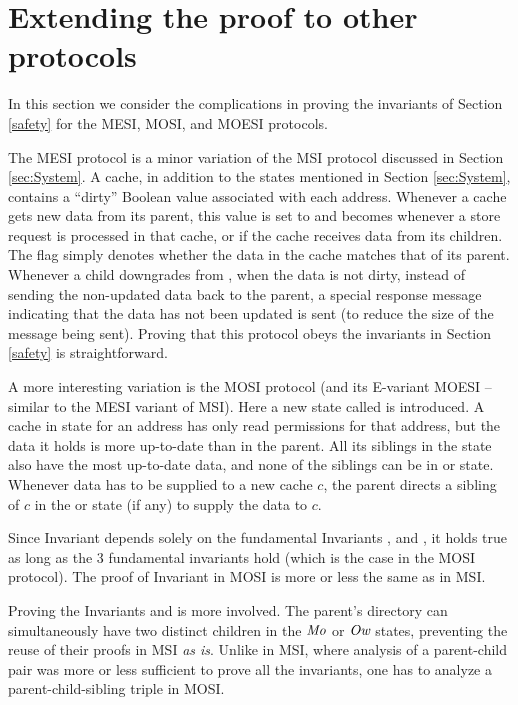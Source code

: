 \section{Extending the proof to other protocols}
\label{sec:Refinements}

In this section we consider the complications in proving the invariants
of Section \ref{safety} for the MESI, MOSI, and MOESI protocols.

The MESI protocol is a minor variation of the MSI protocol discussed in Section \ref{sec:System}.
A cache, in addition to the states mentioned in Section
\ref{sec:System}, contains a ``dirty'' Boolean value associated with each
address.  Whenever a cache gets new data from its parent, this value is set to
\False{} and becomes \True{} whenever a store request is processed in that
cache, or if the cache receives data from its children. The flag simply denotes
whether the data in the cache matches that of its parent.  Whenever a
child downgrades from \Mo{}, when the data is not dirty, instead of sending the
non-updated data back to the parent, a special response message indicating that
the data has not been updated is sent (to reduce the size of the message being
sent). Proving that this protocol obeys the invariants in Section \ref{safety}
is straightforward.

A more interesting variation is the MOSI protocol (and its E-variant MOESI --
similar to the MESI variant of MSI). Here a new state called \Ow{} is
introduced. A cache in \Ow{} state for an address has only read permissions for
that address, but the data it holds is more up-to-date than in the parent.  All
its siblings in the \Sh{} state also have the most up-to-date data, and none of
the siblings can be in \Mo{} or \Ow{} state.  Whenever data has to be supplied
to a new cache $c$, the parent directs a sibling of $c$ in the \Ow{} or \Mo{}
state (if any) to supply the data to $c$.

Since Invariant  depends solely on the fundamental Invariants
,  and , it holds true
as long as the 3 fundamental invariants hold (which is the case in the MOSI
protocol). The proof of Invariant  in MOSI is more
or less the same as in MSI.

Proving the Invariants  and
 is more involved. The parent's directory can
simultaneously have two distinct children in the $\textit{Mo}$ or $\textit{Ow}$ states,
preventing the reuse of their proofs in MSI \emph{as is}. Unlike in MSI, where
analysis of a parent-child pair was more or less sufficient to prove all the
invariants, one has to analyze a parent-child-sibling triple in MOSI.
